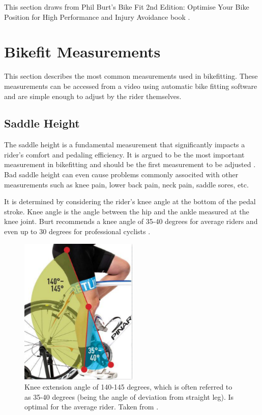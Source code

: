 This section draws from Phil Burt's Bike Fit 2nd Edition: Optimise Your Bike Position for High Performance and Injury Avoidance book \cite{burtbikefit}.

\section{Bikefit Measurements}
This section describes the most common measurements used in bikefitting. These measurements can be accessed from a video using automatic bike fitting software and are simple enough to adjust by the rider themselves.

\subsection{Saddle Height}
The saddle height is a fundamental measurement that significantly impacts a rider's comfort and pedaling efficiency. It is argued to be the most important measurement in bikefitting and should be the first measurement to be adjusted \cite{burtbikefit}. Bad saddle height can even cause problems commonly associted with other measurements such as knee pain, lower back pain, neck pain, saddle sores, etc.

It is determined by considering the rider's knee angle at the bottom of the pedal stroke. Knee angle is the angle between the hip and the ankle measured at the knee joint. Burt recommends a knee angle of 35-40 degrees for average riders and even up to 30 degrees for professional cyclists \cite{burtbikefit}.

\begin{figure}[htbp]
    \centering
    \includegraphics[width=0.5\textwidth]{obrazky-figures/burt_knee_angle.png}
    \caption{Knee extension angle of 140-145 degrees, which is often referred to as 35-40 degrees (being the angle of deviation from straight leg). Is optimal for the average rider. Taken from \cite{burtbikefit}.}
    \label{fig:saddle_height}
\end{figure}



